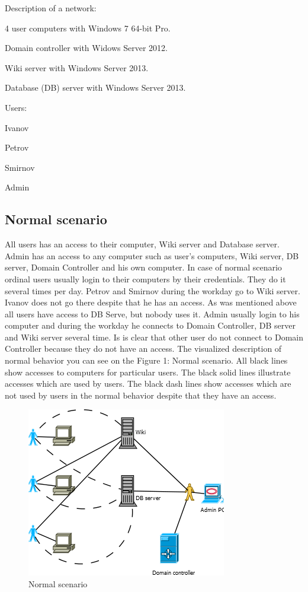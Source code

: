 Description of a network:
\begin{compactitem}
\item 4 user computers with Windows 7 64-bit Pro.
\item Domain controller with Widows Server 2012.
\item Wiki server with Windows Server 2013.
\item Database (DB) server with Windows Server 2013.
\end{compactitem}
Users: 
\begin{compactitem}
\item Ivanov
\item Petrov
\item Smirnov
\item Admin
\end{compactitem}
     
\subsection{Normal scenario}
All users has an access to their computer, Wiki server and Database server. Admin has an access to any computer such as user's computers, Wiki server, DB server, Domain Controller and his own computer.  In case of normal scenario ordinal users usually login to their computers by their credentials. They do it several times per day. Petrov and Smirnov during the workday go to Wiki server. Ivanov does not go there despite that he has an access. As was mentioned above all users  have access to DB Serve, but nobody uses it. Admin usually login to his computer and during the workday he connects to Domain Controller, DB server and Wiki server several time. Is is clear that other user do not connect to Domain Controller because they do not have an access. The visualized description of normal behavior you can see on the Figure 1: Normal scenario. All black lines show  accesses to computers for particular users. The black solid lines illustrate accesses which are used by users. The black dash lines show accesses which are not used by users in the normal behavior despite that they have an access. 
\begin{figure}[ht!]
\centering
\includegraphics{scenario_normal.png}
\caption{Normal scenario}
\label{overflow}
\end{figure}

